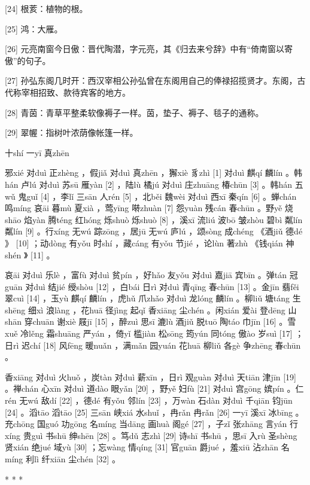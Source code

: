 \documentclass[12pt,UTF8]{ctexbook}
\begin{document}
[24] 根荄：植物的根。

[25] 鸿：大雁。

[26] 元亮南窗今日傲：晋代陶潜，字元亮，其《归去来兮辞》中有“倚南窗以寄傲”的句子。

[27] 孙弘东阁几时开：西汉宰相公孙弘曾在东阁用自己的俸禄招揽贤才。东阁，古代称宰相招致、款待宾客的地方。

[28] 青茵：青草平整柔软像褥子一样。茵，垫子、褥子、毯子的通称。

[29] 翠幄：指树叶浓荫像帐篷一样。





十shí 一yī 真zhēn


邪xié 对duì 正zhèng ，假jiǎ 对duì 真zhēn ，獬xiè 豸zhì [1] 对duì 麒qí 麟lín 。韩hán 卢lú 对duì 苏sū 雁yàn [2] ，陆lù 橘jú 对duì 庄zhuāng 椿chūn [3] 。韩hán 五wǔ 鬼guǐ [4] ，李lǐ 三sān 人rén [5] ，北běi 魏wèi 对duì 西xī 秦qín [6] 。蝉chán 鸣míng 哀āi 暮mù 夏xià ，莺yīng 啭zhuàn [7] 怨yuàn 残cán 春chūn 。野yě 烧shāo 焰yàn 腾téng 红hóng 烁shuò 烁shuò [8] ，溪xī 流liú 波bō 皱zhòu 碧bì 粼lín 粼lín [9] 。行xíng 无wú 踪zōng ，居jū 无wú 庐lú ，颂sòng 成chéng 《酒jiǔ 德dé 》 [10] ；动dòng 有yǒu 时shí ，藏cáng 有yǒu 节jié ，论lùn 著zhù 《钱qián 神shén 》 [11] 。

哀āi 对duì 乐lè ，富fù 对duì 贫pín ，好hǎo 友yǒu 对duì 嘉jiā 宾bīn 。弹tán 冠guān 对duì 结jié 绶shòu [12] ，白bái 日rì 对duì 青qīng 春chūn [13] 。金jīn 翡fěi 翠cuì [14] ，玉yù 麒qí 麟lín ，虎hǔ 爪zhǎo 对duì 龙lóng 麟lín 。柳liǔ 塘táng 生shēng 细xì 浪làng ，花huā 径jìng 起qǐ 香xiāng 尘chén 。闲xián 爱ài 登dēng 山shān 穿chuān 谢xiè 屐jī [15] ，醉zuì 思sī 漉lù 酒jiǔ 脱tuō 陶táo 巾jīn [16] 。雪xuě 冷lěng 霜shuāng 严yán ，倚yǐ 槛jiàn 松sōng 筠yún 同tóng 傲ào 岁suì [17] ；日rì 迟chí [18] 风fēng 暖nuǎn ，满mǎn 园yuán 花huā 柳liǔ 各gè 争zhēng 春chūn 。

香xiāng 对duì 火huǒ ，炭tàn 对duì 薪xīn ，日rì 观guàn 对duì 天tiān 津jīn [19] 。禅chán 心xīn 对duì 道dào 眼yǎn [20] ，野yě 妇fù [21] 对duì 宫gōng 嫔pín 。仁rén 无wú 敌dí [22] ，德dé 有yǒu 邻lín [23] ，万wàn 石dàn 对duì 千qiān 钧jūn [24] 。滔tāo 滔tāo [25] 三sān 峡xiá 水shuǐ ，冉rǎn 冉rǎn [26] 一yī 溪xī 冰bīng 。充chōng 国guó 功gōng 名míng 当dāng 画huà 阁gé [27] ，子zǐ 张zhāng 言yán 行xíng 贵guì 书shū 绅shēn [28] 。笃dǔ 志zhì [29] 诗shī 书shū ，思sī 入rù 圣shèng 贤xián 绝jué 域yù [30] ；忘wàng 情qíng [31] 官guān 爵jué ，羞xiū 沾zhān 名míng 利lì 纤xiān 尘chén [32] 。



* * *
\end{document}
